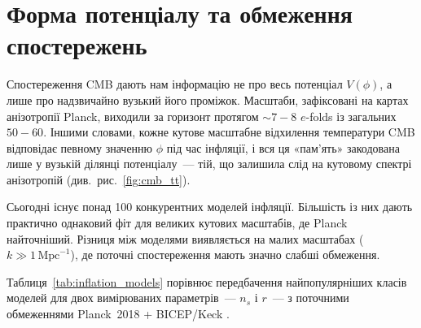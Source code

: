 \section{Форма потенціалу та обмеження спостережень}

Спостереження CMB дають нам інформацію не про весь потенціал
$V(\phi)$, а лише про надзвичайно вузький його проміжок. Масштаби,
зафіксовані на картах анізотропії Planck, виходили за горизонт
протягом $\sim\!7 - 8$ $e$-folds із загальних $50 - 60$. Іншими
словами, кожне кутове масштабне відхилення температури CMB
відповідає певному значенню $\phi$ під час інфляції, і вся ця
«пам'ять» закодована лише у вузькій ділянці потенціалу~---
тій, що залишила слід на кутовому спектрі анізотропій
(див.\ рис.~\ref{fig:cmb_tt}).


Сьогодні існує понад 100 конкурентних моделей інфляції.
Більшість із них дають практично однаковий фіт для великих
кутових масштабів, де Planck найточніший. Різниця між
моделями виявляється на малих масштабах
($k \gg 1\,\mathrm{Mpc}^{-1}$), де поточні спостереження
мають значно слабші обмеження.

Таблиця~\ref{tab:inflation_models} порівнює передбачення
найпопулярніших класів моделей для двох вимірюваних
параметрів~--- $n_s$ і $r$~--- з поточними обмеженнями
Planck~2018 \cite{planck_2018} + BICEP/Keck \cite{bicep_keck_2021}.

